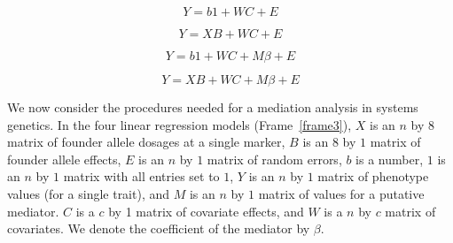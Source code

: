\documentclass[oneside]{book}\usepackage[]{graphicx}\usepackage[]{color}
\newenvironment{frameenv}[1]
    {\begin{myfloat}[tb]
    \begin{mdframed}[roundcorner=10pt,backgroundcolor=blue!10]
    \caption{#1}
    }
    {%
    \end{mdframed}\end{myfloat}
    }
\begin{document}
\begin{titlepage}


\begin{frameenv}{Four regressions for a single mediation analysis}\label{frame3}


\begin{equation}
Y = b1 + WC + E
\label{model1}
\end{equation}

\begin{equation}
Y = XB + WC + E
\label{model2}
\end{equation}

\begin{equation}
Y = b1 + WC + M\beta + E
\label{model3}
\end{equation}

\begin{equation}
Y = XB + WC + M\beta + E
\label{model4}
\end{equation}
\end{frameenv}

We now consider the procedures needed for a mediation analysis in systems genetics.
In the four linear regression models (Frame~\ref{frame3}), $X$ is an $n$ by $8$ matrix of
founder allele dosages at a single marker, $B$ is an $8$ by $1$ matrix of founder allele
effects, $E$ is an $n$ by $1$ matrix of random errors, $b$
is a number, $1$ is
an $n$ by $1$ matrix with all entries set to $1$, $Y$ is
an $n$ by $1$ matrix of
phenotype values (for a single trait), and $M$ is an $n$
by $1$ matrix of values for a putative mediator.
$C$ is a $c$ by 1 matrix of covariate effects, and $W$ is
a $n$ by $c$ matrix of covariates.
We denote the coefficient of the mediator by $\beta$.


\end{titlepage}
\end{document}
